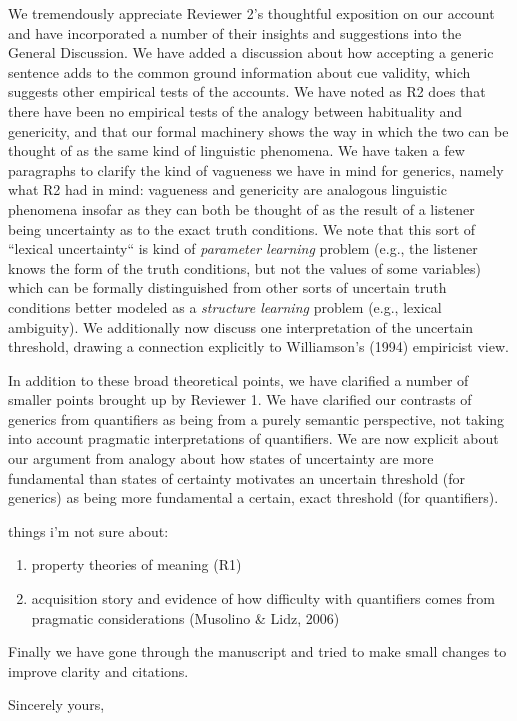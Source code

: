 \documentclass[11pt,letterpaper]{letter} %
\begin{document}
\begin{letter}
We tremendously appreciate Reviewer 2's thoughtful exposition on our account and have incorporated a number of their insights and suggestions into the General Discussion.
We have added a discussion about how accepting a generic sentence adds to the common ground information about cue validity, which suggests other empirical tests of the accounts.
We have noted as R2 does that there have been no empirical tests of the analogy between habituality and genericity, and that our formal machinery shows the way in which the two can be thought of as the same kind of linguistic phenomena.
We have taken a few paragraphs to clarify the kind of vagueness we have in mind for generics, namely what R2 had in mind: vagueness and genericity are analogous linguistic phenomena insofar as they can both be thought of as the result of a listener being uncertainty as to the exact truth conditions. 
We note that this sort of ``lexical uncertainty`` is kind of \emph{parameter learning} problem (e.g., the listener knows the form of the truth conditions, but not the values of some variables) which can be formally distinguished from other sorts of uncertain truth conditions better modeled as a \emph{structure learning} problem (e.g., lexical ambiguity). 
We additionally now discuss one interpretation of the uncertain threshold, drawing a connection explicitly to Williamson's (1994) empiricist view.

In addition to these broad theoretical points, we have clarified a number of smaller points brought up by Reviewer 1.
We have clarified our contrasts of generics from quantifiers as being from a purely semantic perspective, not taking into account pragmatic interpretations of quantifiers. 
We are now explicit about our argument from analogy about how states of uncertainty are more fundamental than states of certainty motivates an uncertain threshold (for generics) as being more fundamental a certain, exact threshold (for quantifiers).


things i'm not sure about:
\begin{enumerate}
\item property theories of meaning (R1)
\item acquisition story and evidence of how difficulty with quantifiers comes from pragmatic considerations (Musolino \& Lidz, 2006)
\end{enumerate}

Finally we have gone through the manuscript and tried to make small changes to improve clarity and citations.

\closing{Sincerely yours,}

\end{letter}
\end{document}
